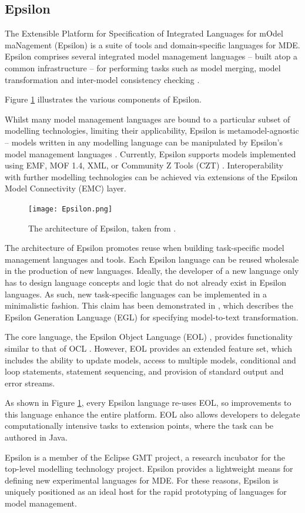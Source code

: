 \subsection{Epsilon}
\label{subsec:epsilon}
The Extensible Platform for Specification of Integrated Languages for mOdel maNagement (Epsilon) \cite{epsilon} is a suite of tools and domain-specific languages for MDE. Epsilon comprises several integrated model management languages -- built atop a common infrastructure -- for performing tasks such as model merging, model transformation and inter-model consistency checking \cite{kolovos09thesis}. 

Figure \ref{fig:epsilon} illustrates the various components of Epsilon.

Whilst many model management languages are bound to a particular subset of modelling technologies, limiting their applicability, Epsilon is metamodel-agnostic -- models written in any modelling language can be manipulated by Epsilon's model management languages \cite{kolovos06eol}. Currently, Epsilon supports models implemented using EMF, MOF 1.4, XML, or Community Z Tools (CZT) \cite{czt}. Interoperability with further modelling technologies can be achieved via extensions of the Epsilon Model Connectivity (EMC) layer. 

\begin{figure}[htbp]
  \begin{center}
    \leavevmode
    \texttt{[image: Epsilon.png]}
  \end{center}
  \caption{The architecture of Epsilon, taken from \cite{rose08egl}.}
  \label{fig:epsilon}
\end{figure}

The architecture of Epsilon promotes reuse when building task-specific model management languages and tools.  Each Epsilon language can be reused wholesale in the production of new languages. Ideally, the developer of a new language only has to design language concepts and logic that do not already exist in Epsilon languages. As such, new task-specific languages can be implemented in a minimalistic fashion. This claim has been demonstrated in \cite{rose08egl}, which describes the Epsilon Generation Language (EGL) for specifying model-to-text transformation.

The core language, the Epsilon Object Language (EOL) \cite{kolovos06eol}, provides functionality similar to that of OCL \cite{ocl2}. However, EOL provides an extended feature set, which includes the ability to update models, access to multiple models, conditional and loop statements, statement sequencing, and provision of standard output and error streams.

As shown in Figure \ref{fig:epsilon}, every Epsilon language re-uses EOL, so improvements to this language enhance the entire platform. EOL also allows developers to delegate computationally intensive tasks to extension points, where the task can be authored in Java.

Epsilon is a member of the Eclipse GMT \cite{gmt} project, a research incubator for the top-level modelling technology project. Epsilon provides a lightweight means for defining new experimental languages for MDE. For these reasons, Epsilon is uniquely positioned as an ideal host for the rapid prototyping of languages for model management.